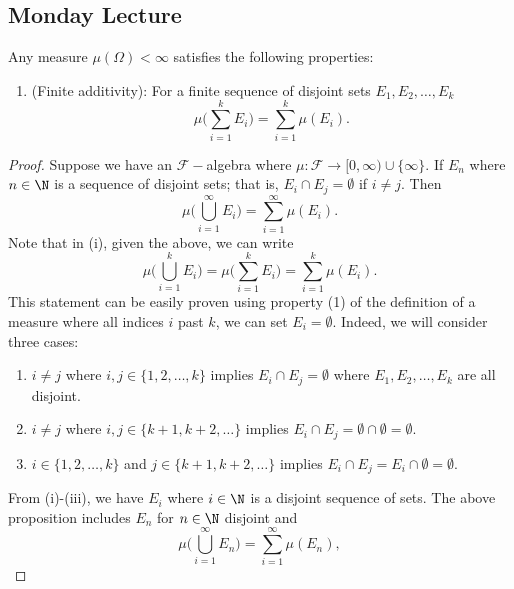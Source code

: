 \subsection{Monday Lecture}

\begin{prop}
   Any measure \( \mu (\Omega) < \infty  \) satisfies the following properties: 
   \begin{enumerate}
       \item[(i)] (Finite additivity): For a finite sequence of disjoint sets \( {E}_{1}, {E}_{2}, \dots, {E}_{k} \)
            \[  \mu \Big(  \sum_{ i=1  }^{ k  } {E}_{i} \Big) = \sum_{ i=1  }^{ k  } \mu({E}_{i}). \]
   \end{enumerate}
\end{prop}
\begin{proof}
Suppose we have an \( \mathcal{F}-   \)algebra where \( \mu : \mathcal{F} \to [0,\infty) \cup  \{ \infty  \}  \). If \( {E}_{n} \) where \( n \in \N  \) is a sequence of disjoint sets; that is, \( {E}_{i} \cap {E}_{j} = \emptyset  \) if \( i \neq j  \). Then 
\[  \mu \Big(  \bigcup_{ i=1  }^{ \infty  }  {E}_{i} \Big) = \sum_{ i=1  }^{ \infty  } \mu({E}_{i}). \]
Note that in (i), given the above, we can write
\[  \mu \Big(  \bigcup_{ i= 1  }^{ k }  {E}_{i} \Big) = \mu \Big(  \sum_{ i=1  }^{ k } {E}_{i} \Big) = \sum_{ i=1  }^{ k } \mu({E}_{i}).  \]
This statement can be easily proven using property (1) of the definition of a measure where all indices \( i \) past \( k \), we can set \( {E}_{i} = \emptyset \). Indeed, we will consider three cases:   
\begin{enumerate}
    \item[(1)] \( i \neq j  \) where \( i,j \in \{  1,2,\dots, k  \}  \) implies \( {E}_{i} \cap {E}_{j} = \emptyset \) where \( {E}_{1}, {E}_{2}, \dots, {E}_{k} \) are all disjoint.
    \item[(2)] \( i \neq j  \) where \( i,j  \in \{  k + 1 , k + 2, \dots  \}  \) implies \( {E}_{i} \cap {E}_{j} = \emptyset \cap \emptyset = \emptyset \).
    \item[(3)] \( i \in \{  1,2,\dots, k  \}  \) and \( j \in \{  k + 1 , k + 2 , \dots  \}  \) implies \( {E}_{i} \cap {E}_{j} = {E}_{i} \cap \emptyset  = \emptyset\).
\end{enumerate}
From (i)-(iii), we have \( {E}_{i}  \) where \( i \in \N  \) is a disjoint sequence of sets. The above proposition includes \( {E}_{n}  \) for \( n \in \N  \) disjoint and 
\[  \mu\Big(\bigcup_{ i = 1  }^{ \infty  }  {E}_{n}\Big) = \sum_{ i=1  }^{ \infty  } \mu({E}_{n}), \]

\end{proof}
